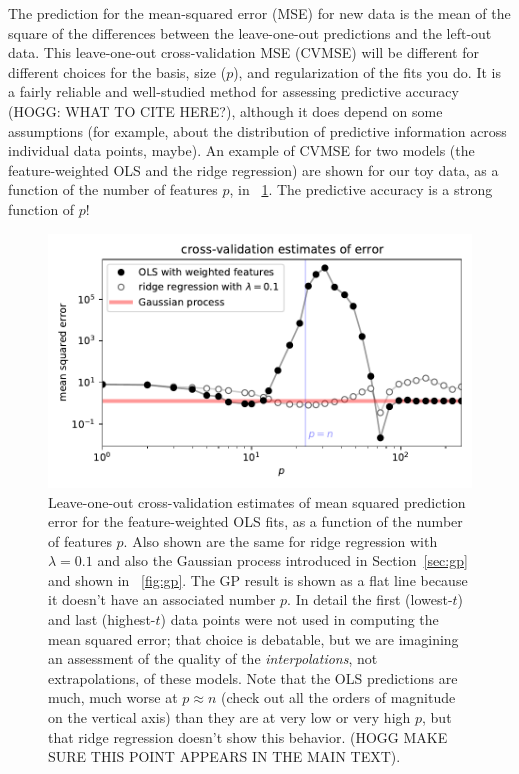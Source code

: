 \documentclass[12pt,letterpaper]{article}
\newlength{\figurewidth}
\newcommand{\sectionname}{Section}
\begin{document}
The prediction for the mean-squared error (MSE) for new data is the mean of the square of the differences between the leave-one-out predictions and the left-out data.
This leave-one-out cross-validation MSE (CVMSE) will be different for different choices for the basis, size ($p$), and regularization of the fits you do.
It is a fairly reliable and well-studied method for assessing predictive accuracy (HOGG: WHAT TO CITE HERE?), although it does depend on some assumptions (for example, about the distribution of predictive information across individual data points, maybe).
An example of CVMSE for two models (the feature-weighted OLS and the ridge regression) are shown for our toy data, as a function of the number of features $p$, in \figurename~\ref{fig:cv}.
The predictive accuracy is a strong function of $p$!
\begin{figure}[t]
    \begin{mdframed}
    \includegraphics[width=\figurewidth]{paper/cross-validation.pdf}
    \caption{Leave-one-out cross-validation estimates of mean squared prediction error for the feature-weighted OLS fits, as a function of the number of features $p$. Also shown are the same for ridge regression with $\lambda=0.1$ and also the Gaussian process introduced in \sectionname~\ref{sec:gp} and shown in \figurename~\ref{fig:gp}. The GP result is shown as a flat line because it doesn't have an associated number $p$. In detail the first (lowest-$t$) and last (highest-$t$) data points were not used in computing the mean squared error; that choice is debatable, but we are imagining an assessment of the quality of the \emph{interpolations}, not extrapolations, of these models. Note that the OLS predictions are much, much worse at $p\approx n$ (check out all the orders of magnitude on the vertical axis) than they are at very low or very high $p$, but that ridge regression doesn't show this behavior. (HOGG MAKE SURE THIS POINT APPEARS IN THE MAIN TEXT).}
    \label{fig:cv}
    \end{mdframed}
\end{figure}
\end{document}
